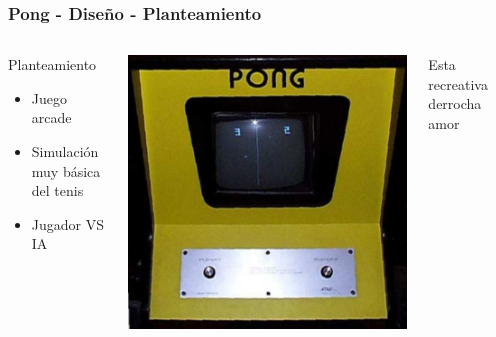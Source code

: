 \begin{frame}
	\frametitle{Pong - Diseño - Planteamiento}
	
	\begin{columns}[c]
	\column{175pt}	
	
	\begin{block}{Planteamiento}
		\begin{itemize}
			\item Juego arcade
			\item Simulación muy básica del tenis
			\item Jugador VS IA
		\end{itemize}            
	\end{block}
	
	\column{125pt}
	
	\begin{center}
		\includegraphics[scale=0.2]{img/pong-recreativa-2.jpg}
	\end{center}
	
	\begin{center}
	    Esta recreativa derrocha amor
	\end{center}	
	
	
	\end{columns}
	
\end{frame}

